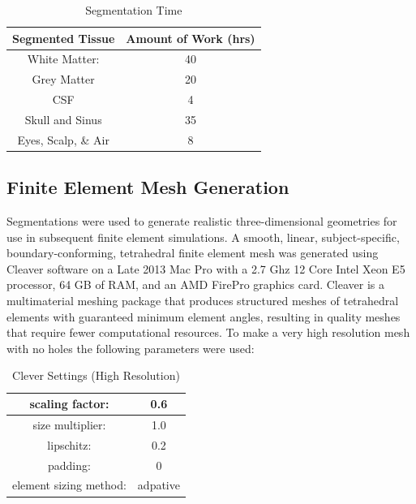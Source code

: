 \begin{table}[H]
\centering
\caption{Segmentation Time}
\label{tab:seg}
\begin{tabular}{|c|c|}
\hline
Segmented Tissue    & Amount of Work (hrs) \\ \hline
White Matter:       & 40                   \\ \hline
Grey Matter         & 20                   \\ \hline
CSF                 & 4                    \\ \hline
Skull and Sinus     & 35                   \\ \hline
Eyes, Scalp, \& Air & 8                    \\ \hline
\end{tabular}
\end{table}

\subsection{Finite Element Mesh Generation}
\label{sec:mesh}


Segmentations were used to generate realistic three-dimensional geometries for use in subsequent finite element simulations. A smooth, linear, subject-specific, boundary-conforming, tetrahedral finite element mesh was generated using Cleaver software \cite{ref:cleaver} on a Late 2013 Mac Pro with a 2.7 Ghz 12 Core Intel Xeon E5 processor, 64 GB of RAM, and an AMD FirePro graphics card. Cleaver is a multimaterial meshing package that produces structured meshes of tetrahedral elements with guaranteed minimum element angles, resulting in quality meshes that require fewer computational resources. To make a very high resolution mesh with no holes the following parameters were used: 

\begin{table}[H]
\centering
\caption{Clever Settings (High Resolution)}
\label{my-label}
\begin{tabular}{|c|c|}
\hline
scaling factor:                    & 0.6                 \\ \hline
size multiplier:                   & 1.0                 \\ \hline
lipschitz:                         & 0.2                 \\ \hline
padding:                           & 0                   \\ \hline
element sizing method:             & adpative            \\ \hline
\end{tabular}
\end{table}

